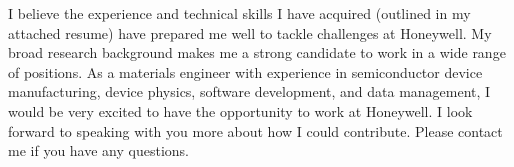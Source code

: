 \documentclass[11pt,a4paper,roman]{moderncv}        %
\begin{document}

I believe the experience and technical skills I have acquired (outlined in my attached resume) have prepared me well to tackle challenges at Honeywell.  
My broad research background makes me a strong candidate to work in a wide range of positions.
As a materials engineer with experience in semiconductor device manufacturing, device physics, software development, and data management, I would be very excited to have the opportunity to work at Honeywell.  
I look forward to speaking with you more about how I could contribute.  
Please contact me if you have any questions.




\makeletterclosing
\end{document}
